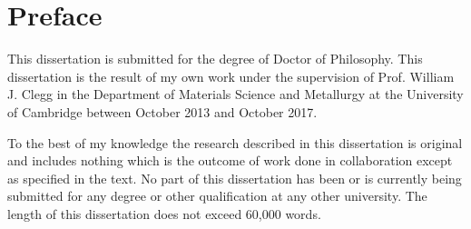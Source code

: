 
\clearpage

\doublespacing

\section*{Preface}



\noindent
This dissertation is submitted for the degree of Doctor of Philosophy. This dissertation is the result of my own work under the supervision of Prof. William J. Clegg in the Department of Materials Science and Metallurgy at the University of Cambridge between October 2013 and October 2017.
\par\bigskip
\noindent
To the best of my knowledge the research described in this dissertation is original and includes nothing which is the outcome of work done in collaboration except as specified in the text. No part of this dissertation has been or is currently being submitted for any degree or other qualification at any other university. The length of this dissertation does not exceed 60,000 words.

\singlespacing